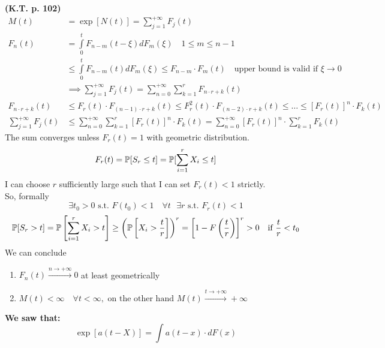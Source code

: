 \textbf{(K.T. p. 102)}
\begin{equation}
	\begin{split}
		M(t) &= \exp[N(t)] = \sum\limits_{j=1}^{+\infty}F_j(t) \\
		F_n(t) &= \int\limits_0^t F_{n-m}(t-\xi) dF_m(\xi) \quad 1 \le m \le n-1\\
		& \le \int\limits_0^t F_{n-m}(t) dF_m(\xi) \le F_{n-m} \cdot F_m(t) \quad \text{upper bound is valid if }\xi \to 0 \\
		&\implies \sum\limits_{j=1}^{+\infty}F_j(t)= \sum\limits_{n=0}^{+\infty} \sum\limits_{k=1}^{r}F_{n \cdot r + k}(t) \\
		F_{n \cdot r + k} (t) &\le F_r(t) \cdot F_{(n-1)\cdot r + k}(t) \le F_r^2(t) \cdot F_{(n-2)\cdot r +k}(t) \le \dots
		\le \left[F_r(t)\right]^n \cdot F_k(t)\\
		\sum\limits_{j=1}^{+\infty}F_j(t) &\le \sum\limits_{n=0}^{+\infty} \sum\limits_{k=1}^{r}\left[F_r(t)\right]^n \cdot F_k(t)
		= \sum\limits_{n=0}^{+\infty} \left[F_r(t)\right]^n \cdot \sum\limits_{k=1}^{r}F_k(t)
	\end{split}
\end{equation}
The sum converges unless $F_r(t)=1$ with geometric distribution.
\begin{equation}
	F_r(t)=\mathbb{P}[S_r\le t]=\mathbb{P}[\sum\limits_{i=1}^r X_i \le t]
\end{equation}
I can choose $r$ sufficiently large such that I can set $F_r(t)<1$ strictly. \\
So, formally
	$$\exists t_0 >0 \text{ s.t. } F(t_0)<1 \quad \forall t \mbox{ }	\exists r \text{ s.t. } F_r(t)<1$$
\begin{equation*}
	\mathbb{P}[S_r >t] = \mathbb{P}\left[\sum\limits_{i=1}^r X_i > t \right] \ge
	\left(\mathbb{P}\left[X_i > \frac{t}{r}\right]\right)^r = \left[1-F\left(\frac{t}{r}\right)\right]^r>0
	\quad \text{if }\frac{t}{r}<t_0
\end{equation*}
We can conclude
\begin{enumerate}
	\item $F_n(t)\xrightarrow{n\to +\infty}0$ at least geometrically
	\item $M(t)<\infty \quad \forall t < \infty, \text{ on the other hand }	M(t)\xrightarrow{t \to +\infty}+\infty$
\end{enumerate}

\textbf{We saw that:}
$$\exp[a(t-X)]=\int a(t-x)\cdot dF(x)$$

